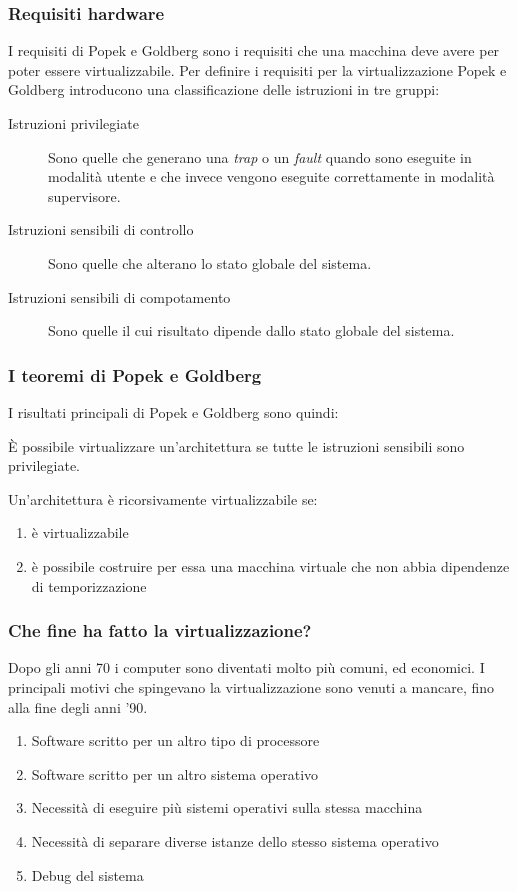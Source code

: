 \documentclass[ignorenonframetext]{beamer}
\begin{document}
  \begin{frame}
  \frametitle{Requisiti hardware}
  I requisiti di Popek e Goldberg sono i requisiti che una macchina deve
  avere per poter essere virtualizzabile. Per definire i requisiti per la
  virtualizzazione Popek e Goldberg introducono una classificazione delle
  istruzioni in tre gruppi:
  \begin{description}
  \item[Istruzioni privilegiate] Sono quelle che generano una \textit{trap} o
  un \textit{fault} quando sono eseguite in modalità utente e che invece
  vengono eseguite correttamente in modalità supervisore.
  \item[Istruzioni sensibili di controllo] Sono quelle che alterano lo stato
  globale del sistema.
  \item[Istruzioni sensibili di compotamento] Sono quelle il cui risultato
  dipende dallo stato globale del sistema.
  \end{description}
  \end{frame}
  
  \begin{frame}
  \frametitle{I teoremi di Popek e Goldberg}
  I risultati principali di Popek e Goldberg sono quindi:
  
  \begin{theorem}
  È possibile virtualizzare un'architettura se tutte le istruzioni sensibili
  sono privilegiate. 
  \end{theorem}
  
  \begin{theorem}
  Un'architettura è ricorsivamente virtualizzabile se:
  \begin{enumerate}
  \item è virtualizzabile
  \item è possibile costruire per essa una macchina virtuale che non abbia
  dipendenze di temporizzazione
  \end{enumerate}
  \end{theorem}
  \end{frame}
  
  \begin{frame}
  \frametitle{Che fine ha fatto la virtualizzazione?}
  Dopo gli anni 70 i computer sono diventati molto più comuni, ed economici.
  I principali motivi che spingevano la virtualizzazione sono venuti a
  mancare, fino alla fine degli anni '90.
  
  \begin{enumerate}
  \item Software scritto per un altro tipo di processore
  \item Software scritto per un altro sistema operativo
  \item Necessità di eseguire più sistemi operativi sulla stessa macchina
  \item Necessità di separare diverse istanze dello stesso sistema operativo
  \item Debug del sistema
  \end{enumerate}
  \end{frame}
  
\end{document}
